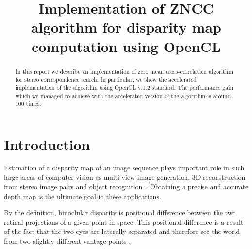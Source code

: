 \documentclass[conference]{IEEEtran}
\begin{document}
%

\title{Implementation of ZNCC algorithm for disparity map computation using OpenCL}

\author{
    \and
}


\maketitle


\begin{abstract}
In this report we describe an implementation of zero mean cross-correlation algorithm for stereo correspondence search. In particular, we show the accelerated implementation of the algorithm using OpenCL v.1.2 standard. The performance gain which we managed to achieve with the accelerated version of the algorithm is around 100 times.
\end{abstract}


\section{Introduction}
Estimation of a disparity map of an image sequence plays important role in such large areas of computer vision as multi-view image generation, 3D reconstruction from stereo image pairs and object recognition~\cite{Redert99, arsenio97}. Obtaining a precise and accurate depth map is the ultimate goal in these applications.

By the definition, binoclular disparity is positional difference between the two retinal projections of a given point in space. This positional difference is a result of the fact that the two eyes are laterally separated and therefore see the world from two slightly different vantage points \cite{Qian1997359}.
\end{document}
